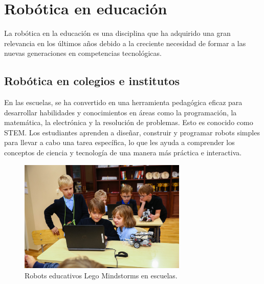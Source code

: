 \section{Robótica en educación}
\label{sec:segundaseccion}
La robótica en la educación es una disciplina que ha adquirido una gran relevancia en los últimos años debido a la creciente necesidad 
de formar a las nuevas generaciones en competencias tecnológicas.
\subsection{Robótica en colegios e institutos}
En las escuelas, se ha convertido en una herramienta pedagógica eficaz para desarrollar habilidades y conocimientos en áreas como la programación, 
la matemática, la electrónica y la resolución de problemas. Esto es conocido como \ac{STEM}. Los 
estudiantes aprenden a diseñar, construir y programar robots simples para llevar a cabo una tarea específica, lo que les ayuda a comprender  
los conceptos de ciencia y tecnología de una manera más práctica e interactiva.\\
\begin{figure} [h!]
  \begin{center}
    \includegraphics[width=8cm]{figs/education_robot.jpg}
  \end{center}
  \caption{Robots educativos Lego Mindstorms en escuelas.}
  \label{fig:robSecundaria}
\end{figure}\
\newpage
